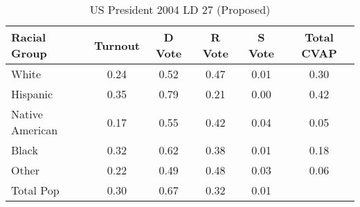 \begin{table}[htb]
\begin{center}
\caption{US President 2004 LD 27 (Proposed)}
\label{pres04_cvap_ld_27}
\begin{tabular}{lccccc}
  \hline
Racial Group & Turnout & D Vote & R Vote & S Vote & Total CVAP \\ 
  \hline
White & 0.24 & 0.52 & 0.47 & 0.01 & 0.30 \\ 
  Hispanic & 0.35 & 0.79 & 0.21 & 0.00 & 0.42 \\ 
  Native American & 0.17 & 0.55 & 0.42 & 0.04 & 0.05 \\ 
  Black & 0.32 & 0.62 & 0.38 & 0.01 & 0.18 \\ 
  Other & 0.22 & 0.49 & 0.48 & 0.03 & 0.06 \\ 
  Total Pop & 0.30 & 0.67 & 0.32 & 0.01 &  \\ 
   \hline
\end{tabular}
\end{center}
\end{table}

